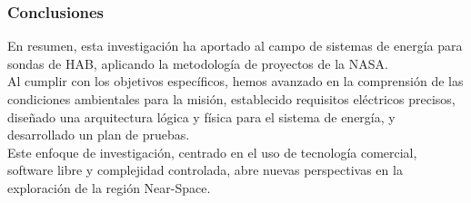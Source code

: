 
\begin{frame}
\frametitle{Conclusiones}
En resumen, esta investigación ha aportado al campo de sistemas de energía para sondas de HAB, aplicando la metodología de proyectos de la NASA.\\
\vspace{0.5 cm}
Al cumplir con los objetivos específicos, hemos avanzado en la comprensión de las condiciones ambientales para la misión, establecido requisitos eléctricos precisos, diseñado una arquitectura lógica y física para el sistema de energía, y desarrollado un plan de pruebas.\\
\vspace{0.5 cm}
Este enfoque de investigación, centrado en el uso de tecnología comercial, software libre y complejidad controlada, abre nuevas perspectivas en la exploración de la región Near-Space.
\end{frame}
